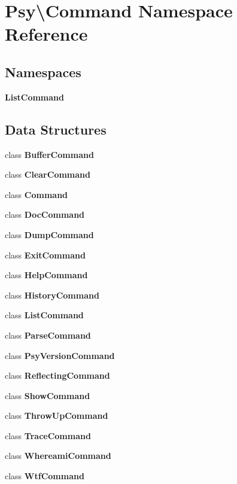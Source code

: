 \section{Psy\textbackslash{}Command Namespace Reference}
\label{namespace_psy_1_1_command}
\subsection*{Namespaces}
\begin{DoxyCompactItemize}
\item 
 {\bf List\+Command}
\end{DoxyCompactItemize}
\subsection*{Data Structures}
\begin{DoxyCompactItemize}
\item 
class {\bf Buffer\+Command}
\item 
class {\bf Clear\+Command}
\item 
class {\bf Command}
\item 
class {\bf Doc\+Command}
\item 
class {\bf Dump\+Command}
\item 
class {\bf Exit\+Command}
\item 
class {\bf Help\+Command}
\item 
class {\bf History\+Command}
\item 
class {\bf List\+Command}
\item 
class {\bf Parse\+Command}
\item 
class {\bf Psy\+Version\+Command}
\item 
class {\bf Reflecting\+Command}
\item 
class {\bf Show\+Command}
\item 
class {\bf Throw\+Up\+Command}
\item 
class {\bf Trace\+Command}
\item 
class {\bf Whereami\+Command}
\item 
class {\bf Wtf\+Command}
\end{DoxyCompactItemize}
